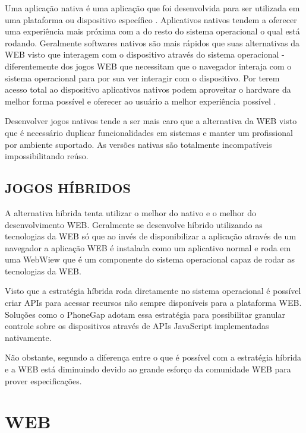 \begin{draft}
Uma aplicação nativa é uma aplicação que foi desenvolvida para ser
utilizada em uma plataforma ou dispositivo específico \autocite[pp.
7]{aSeriousContender}. Aplicativos nativos tendem a oferecer uma
experiência mais próxima com a do resto do sistema operacional o qual
está rodando. Geralmente softwares nativos são mais rápidos que suas
alternativas da WEB visto que interagem com o dispositivo através do
sistema operacional - diferentemente dos jogos WEB que necessitam que o
navegador interaja com o sistema operacional para por sua ver interagir
com o dispositivo.
Por terem acesso total ao dispositivo aplicativos nativos podem aproveitar
o hardware da melhor forma possível e oferecer ao usuário a melhor experiência 
possível \autocite[pp. 7]{aSeriousContender}.

Desenvolver jogos nativos tende a ser mais caro que a alternativa da
WEB visto que é necessário duplicar funcionalidades em sistemas e
manter um profissional por ambiente suportado. As versões nativas são
totalmente incompatíveis impossibilitando reúso.

\subsection{JOGOS HÍBRIDOS}

A alternativa híbrida tenta utilizar o melhor do nativo e o melhor do
desenvolvimento WEB. Geralmente se desenvolve híbrido utilizando as
tecnologias da WEB só que ao invés de disponibilizar a aplicação
através de um navegador a aplicação WEB é instalada como um
aplicativo normal e roda em uma WebWiew que é um componente do sistema
operacional capaz de rodar as tecnologias da WEB.

Visto que a estratégia híbrida roda diretamente no sistema
operacional é possível criar APIs para acessar recursos não sempre
disponíveis para a plataforma WEB. Soluções como o PhoneGap adotam
essa estratégia para possibilitar granular controle sobre os dispositivos
através de APIs JavaScript implementadas nativamente.

Não obstante, segundo \cite[pp.
8]{aSeriousContender} a diferença entre o que é possível com a
estratégia híbrida e a WEB está diminuindo devido ao grande esforço
da comunidade WEB para prover especificações.

\end{draft}
\section{WEB}

